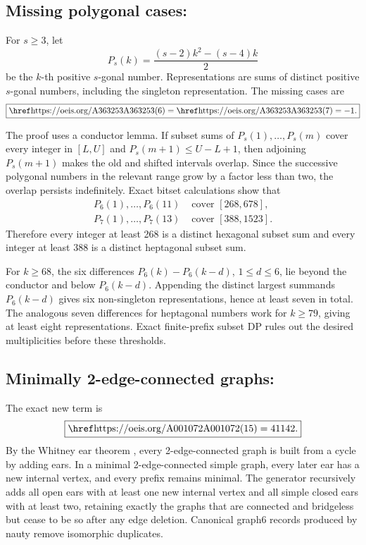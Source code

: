 \subsection{Missing polygonal cases: \texorpdfstring{}{A363253}}

For \(s\ge3\), let
\[
 P_s(k)=\frac{(s-2)k^2-(s-4)k}{2}
\]
be the \(k\)-th positive \(s\)-gonal number.  Representations are sums of
distinct positive \(s\)-gonal numbers, including the singleton representation.
The missing cases are
\begin{equation}
 \boxed{\seq{A363253}(6)=\seq{A363253}(7)=-1.}
 \label{eq:a363253-values}
\end{equation}

The proof uses a conductor lemma.  If subset sums of
\(P_s(1),\ldots,P_s(m)\) cover every integer in \([L,U]\) and
\(P_s(m+1)\le U-L+1\), then adjoining \(P_s(m+1)\) makes the old and shifted
intervals overlap.  Since the successive polygonal numbers in the relevant
range grow by a factor less than two, the overlap persists indefinitely.
Exact bitset calculations show that
\begin{align*}
 P_6(1),\ldots,P_6(11)&\text{ cover }[268,678],\\
 P_7(1),\ldots,P_7(13)&\text{ cover }[388,1523].
\end{align*}
Therefore every integer at least 268 is a distinct hexagonal subset sum and
every integer at least 388 is a distinct heptagonal subset sum.

For \(k\ge68\), the six differences
\(P_6(k)-P_6(k-d)\), \(1\le d\le6\), lie beyond the conductor and below
\(P_6(k-d)\).  Appending the distinct largest summands
\(P_6(k-d)\) gives six non-singleton representations, hence at least seven in
total.  The analogous seven differences for heptagonal numbers work for
\(k\ge79\), giving at least eight representations.  Exact finite-prefix subset
DP rules out the desired multiplicities before these thresholds.

\subsection{Minimally 2-edge-connected graphs: \texorpdfstring{}{A001072}}

The exact new term is
\begin{equation}
 \boxed{\seq{A001072}(15)=41142.}
 \label{eq:a001072-value}
\end{equation}
By the Whitney ear theorem \citep{Whitney1932}, every 2-edge-connected graph is
built from a cycle by adding ears.  In a minimal 2-edge-connected simple graph,
every later ear has a new internal vertex, and every prefix remains minimal.
The generator recursively adds all open ears with at least one new internal
vertex and all simple closed ears with at least two, retaining exactly the
graphs that are connected and bridgeless but cease to be so after any edge
deletion.  Canonical graph6 records produced by nauty
\citep{McKayPiperno2014} remove isomorphic duplicates.

